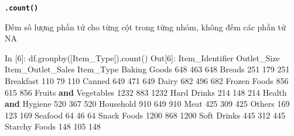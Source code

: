 \documentclass[
]{book}
\newenvironment{Shaded}{\begin{snugshade}}{\end{snugshade}}
\newcommand{\DecValTok}[1]{\textcolor[rgb]{0.00,0.00,0.81}{#1}}
\newcommand{\KeywordTok}[1]{\textcolor[rgb]{0.13,0.29,0.53}{\textbf{#1}}}
\newcommand{\NormalTok}[1]{#1}
\newcommand{\StringTok}[1]{\textcolor[rgb]{0.31,0.60,0.02}{#1}}
\begin{document}
\textbf{\texttt{.count()}}

Đếm số lượng phần tử cho từng cột trong từng nhóm, không đếm các phần tử NA

\begin{Shaded}
\begin{Highlighting}[]
\NormalTok{In [}\DecValTok{6}\NormalTok{]: df.groupby([}\StringTok{\textquotesingle{}Item\_Type\textquotesingle{}}\NormalTok{]).count() }
\NormalTok{Out[}\DecValTok{6}\NormalTok{]:}
\NormalTok{                       Item\_Identifier  Outlet\_Size  Item\_Outlet\_Sales}
\NormalTok{Item\_Type                                                             }
\NormalTok{Baking Goods                       }\DecValTok{648}          \DecValTok{463}                \DecValTok{648}
\NormalTok{Breads                             }\DecValTok{251}          \DecValTok{179}                \DecValTok{251}
\NormalTok{Breakfast                          }\DecValTok{110}           \DecValTok{79}                \DecValTok{110}
\NormalTok{Canned                             }\DecValTok{649}          \DecValTok{471}                \DecValTok{649}
\NormalTok{Dairy                              }\DecValTok{682}          \DecValTok{496}                \DecValTok{682}
\NormalTok{Frozen Foods                       }\DecValTok{856}          \DecValTok{615}                \DecValTok{856}
\NormalTok{Fruits }\KeywordTok{and}\NormalTok{ Vegetables             }\DecValTok{1232}          \DecValTok{883}               \DecValTok{1232}
\NormalTok{Hard Drinks                        }\DecValTok{214}          \DecValTok{148}                \DecValTok{214}
\NormalTok{Health }\KeywordTok{and}\NormalTok{ Hygiene                 }\DecValTok{520}          \DecValTok{367}                \DecValTok{520}
\NormalTok{Household                          }\DecValTok{910}          \DecValTok{649}                \DecValTok{910}
\NormalTok{Meat                               }\DecValTok{425}          \DecValTok{309}                \DecValTok{425}
\NormalTok{Others                             }\DecValTok{169}          \DecValTok{123}                \DecValTok{169}
\NormalTok{Seafood                             }\DecValTok{64}           \DecValTok{46}                 \DecValTok{64}
\NormalTok{Snack Foods                       }\DecValTok{1200}          \DecValTok{868}               \DecValTok{1200}
\NormalTok{Soft Drinks                        }\DecValTok{445}          \DecValTok{312}                \DecValTok{445}
\NormalTok{Starchy Foods                      }\DecValTok{148}          \DecValTok{105}                \DecValTok{148}
\end{Highlighting}
\end{Shaded}
\end{document}
